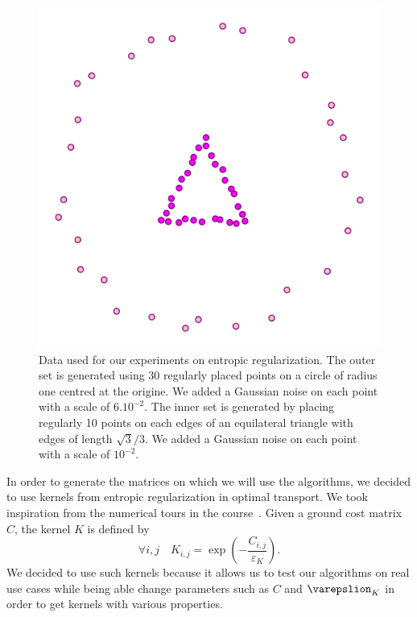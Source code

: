 \begin{figure}[H]
    \centering
    \includegraphics[width=.3\textwidth]{figures/data_sinkhorn}
    \caption{Data used for our experiments on entropic regularization. The outer set is generated using 30 regularly placed points on a circle of radius one centred at the origine. We added a Gaussian noise on each point with a scale of \(6.10^{-2}\). The inner set is generated by placing regularly 10 points on each edges of an equilateral triangle with edges of length \(\sqrt{3}/3\). We added a Gaussian noise on each point with a scale of \(10^{-2}\).}\label{data}
\end{figure}

In order to generate the matrices on which we will use the algorithms, we decided to use kernels from entropic regularization in optimal transport. We took inspiration from the numerical tours in the course~\cite{peyre2011numerical}. Given a ground cost matrix \(C\), the kernel \(K\) is defined by 
\[
    \forall i,j \quad K_{i,j} = \exp\left( -\dfrac{C_{i,j}}{\varepsilon_K} \right).
\]
We decided to use such kernels because it allows us to test our algorithms on real use cases while being able change parameters such as \(C\) and \(\varepslion_K\) in order to get kernels with various properties.

